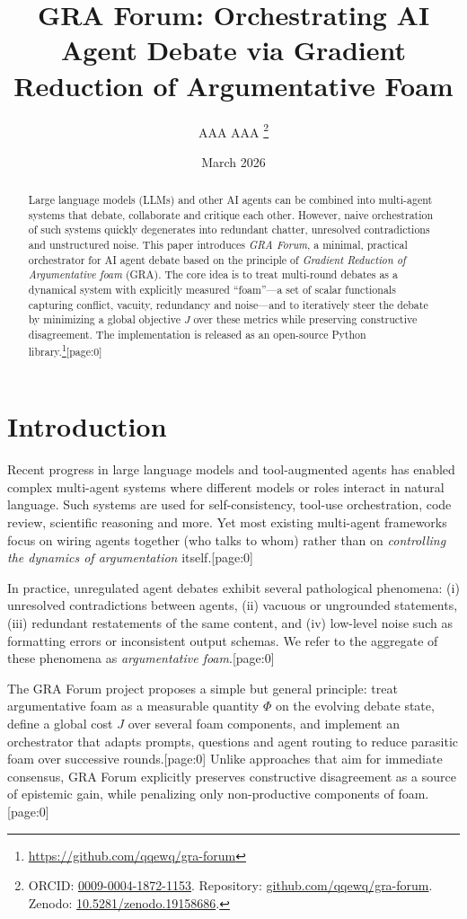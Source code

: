 \documentclass[11pt]{article}
\title{GRA Forum: Orchestrating AI Agent Debate via Gradient Reduction of Argumentative Foam}
\author{AAA AAA%
\thanks{ORCID: \href{https://orcid.org/0009-0004-1872-1153}{0009-0004-1872-1153}.%
Repository: \href{https://github.com/qqewq/gra-forum}{github.com/qqewq/gra-forum}.%
Zenodo: \href{https://doi.org/10.5281/zenodo.19158686}{10.5281/zenodo.19158686}.}}
\date{March 2026}
\begin{document}
\maketitle

\begin{abstract}
Large language models (LLMs) and other AI agents can be combined into multi-agent systems that debate, collaborate and critique each other.
However, naive orchestration of such systems quickly degenerates into redundant chatter, unresolved contradictions and unstructured noise.
This paper introduces \emph{GRA Forum}, a minimal, practical orchestrator for AI agent debate based on the principle of \emph{Gradient Reduction of Argumentative foam} (GRA).
The core idea is to treat multi-round debates as a dynamical system with explicitly measured ``foam''---a set of scalar functionals capturing conflict, vacuity, redundancy and noise---and to iteratively steer the debate by minimizing a global objective \(J\) over these metrics while preserving constructive disagreement.
The implementation is released as an open-source Python library.\footnote{\url{https://github.com/qqewq/gra-forum}}[page:0]
\end{abstract}

\section{Introduction}

Recent progress in large language models and tool-augmented agents has enabled complex multi-agent systems where different models or roles interact in natural language.
Such systems are used for self-consistency, tool-use orchestration, code review, scientific reasoning and more.
Yet most existing multi-agent frameworks focus on wiring agents together (who talks to whom) rather than on \emph{controlling the dynamics of argumentation} itself.[page:0]

In practice, unregulated agent debates exhibit several pathological phenomena:
(i) unresolved contradictions between agents,
(ii) vacuous or ungrounded statements,
(iii) redundant restatements of the same content, and
(iv) low-level noise such as formatting errors or inconsistent output schemas.
We refer to the aggregate of these phenomena as \emph{argumentative foam}.[page:0]

The GRA Forum project proposes a simple but general principle: treat argumentative foam as a measurable quantity \(\Phi\) on the evolving debate state, define a global cost \(J\) over several foam components, and implement an orchestrator that adapts prompts, questions and agent routing to reduce parasitic foam over successive rounds.[page:0]
Unlike approaches that aim for immediate consensus, GRA Forum explicitly preserves constructive disagreement as a source of epistemic gain, while penalizing only non-productive components of foam.[page:0]
\end{document}
